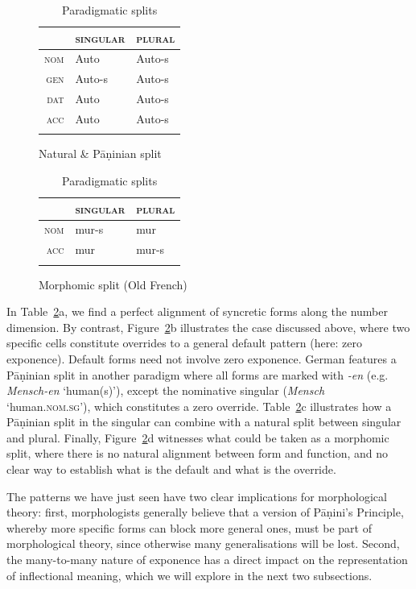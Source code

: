 \documentclass[output=paper
                ,modfonts
                ,nonflat
	        ,collection
	        ,collectionchapter
	        ,collectiontoclongg
 	        ,biblatex
                ,babelshorthands
                ,newtxmath
                ,draftmode
                ,colorlinks, citecolor=brown
]{./langsci/langscibook}
\begin{document}
{\begin{table}[htb]
  \begin{subfigure}{.45\textwidth}
      \begin{tabular}{r|ll}
        \lsptoprule
        & \textsc{singular} & \textsc{plural}\\
        \midrule
        \textsc{nom} & Auto & Auto-s\\
        \textsc{gen} & Auto-s & Auto-s\\
        \textsc{dat} & Auto & Auto-s\\
        \textsc{acc} & Auto & Auto-s\\
        \lspbottomrule
      \end{tabular}
      \caption{Natural \& Pāṇinian split}
    \end{subfigure}
  \begin{subfigure}{.45\textwidth}
    \begin{tabular}{r|ll}
      \lsptoprule
      & \textsc{singular} & \textsc{plural}\\
      \midrule
      \textsc{nom} & mur-s & mur\\
      \textsc{acc} & mur & mur-s\\
      \lspbottomrule
    \end{tabular}

    \caption{Morphomic split (Old French)}
  \end{subfigure}
  
  
  \caption{Paradigmatic splits}
  \label{tab:ParaSplit}
\end{table}

In Table~\ref{tab:ParaSplit}a, we find a perfect alignment of
syncretic forms along the number dimension. By contrast,
Figure~\ref{tab:ParaSplit}b illustrates the case discussed above,
where two specific cells constitute overrides to a general default
pattern (here: zero exponence). Default forms need not involve zero
exponence. German features a Pāṇinian split in another paradigm where
all forms are marked with \textit{-en} (e.g. \textit{Mensch-en}
`human(s)'), except the nominative singular (\textit{Mensch}
`human\textsc{.nom.sg}'), which constitutes a zero
override. Table~\ref{tab:ParaSplit}c illustrates how a Pāṇinian split
in the singular can combine with a natural split between singular and
plural. Finally, Figure~\ref{tab:ParaSplit}d witnesses what could be
taken as a morphomic split, where there is no natural alignment
between form and function, and no clear way to establish what is the
default and what is the override.

The patterns we have just seen have two clear implications for
morphological theory: first,  morphologists generally believe that
a version of Pāṇini's Principle, whereby more specific forms can block
more general ones, must be part of morphological theory, since
otherwise many generalisations will be lost. 
Second, the many-to-many nature of exponence has a direct impact on
the representation of inflectional meaning, which we will explore in
the next two subsections. 

}
\end{document}
